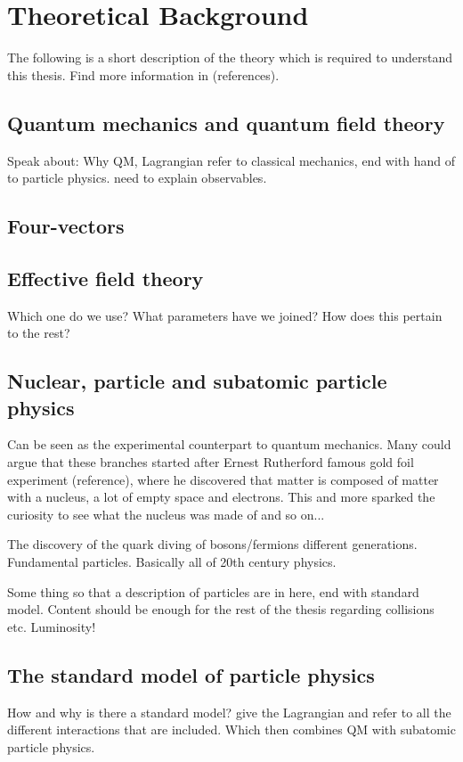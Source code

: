 \section{Theoretical Background}\label{sec:tb}
The following is a short description of the theory which is required to understand this thesis. Find more information in (references).
\subsection{Quantum mechanics and quantum field theory}
Speak about: Why QM, Lagrangian refer to classical mechanics, end with hand of to particle physics. need to explain observables.
\subsection{Four-vectors}
\subsection{Effective field theory}
Which one do we use? What parameters have we joined?
How does this pertain to the rest?

\subsection{Nuclear, particle and subatomic particle physics}
Can be seen as the experimental counterpart to quantum mechanics.
Many could argue that these branches started after Ernest Rutherford famous gold foil experiment (reference), where he discovered that matter is composed of matter with a nucleus, a lot of empty space and electrons. This and more sparked the curiosity to see what the nucleus was made of and so on... 

The discovery of the quark diving of bosons/fermions different generations. Fundamental particles. Basically all of 20th century physics. 

Some thing so that a description of particles are in here, end with standard model.
Content should be enough for the rest of the thesis regarding collisions etc.
Luminosity!

\subsection{The standard model of particle physics} 
How and why is there a standard model? give the Lagrangian and refer to all the different interactions that are included. Which then combines QM with subatomic particle physics.
 
